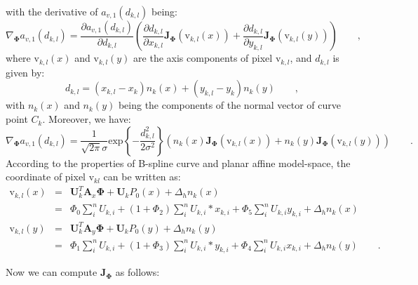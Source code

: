 with the derivative of $a_{v,1}(d_{k,l})$ being:
\begin{equation}
  \label{eq:nablaa}
\nabla_{\mathbf{\Phi}} a_{v,1}(d_{k,l}) = \frac{\partial a_{v,1}(d_{k,l})}{\partial d_{k,l}}
\left( \frac{\partial d_{k,l}}{\partial x_{k,l}}\mathbf{J}_{\mathbf{\Phi}}(\mathrm{v}_{k,l}(x)) + \frac{\partial d_{k,l}}{\partial y_{k,l}}\mathbf{J}_{\mathbf{\Phi}}(\mathrm{v}_{k,l}(y))
 \right)  \qquad,
\end{equation}
where $\mathrm{v}_{k,l}(x)$ and $\mathrm{v}_{k,l}(y)$ are the axis
components of pixel $\mathrm{v}_{k,l}$, and $d_{k,l}$ is given by:
\begin{equation}
  \label{eq:diskl}
  d_{k,l} = (x_{k,l} - x_{k})n_{k}(x) +(y_{k,l} - y_{k}) n_{k}(y)\qquad,
\end{equation}
with $n_{k}(x)$ and $n_{k}(y)$ being the components of the normal vector of
curve point $C_{k}$. Moreover, we have:
\begin{equation}
  \label{eq:nabladkl}
  \nabla_{\mathbf{\Phi}} a_{v,1}(d_{k,l}) = \frac{1}{\sqrt{2\pi}\sigma} \mathrm{exp}\left\{ -\frac{d_{k,l}^2}{2\sigma^2} \right\}
\left( n_k(x)\mathbf{J}_{\mathbf{\Phi}}(\mathrm{v}_{k,l}(x)) + n_k(y)\mathbf{J}_{\mathbf{\Phi}}(\mathrm{v}_{k,l}(y))
 \right) \qquad.
\end{equation}
According to the properties of  B-spline curve  and planar affine
model-space, the coordinate of pixel $\mathrm{v}_{kl}$ can be written
as:
\begin{eqnarray}
  \label{eq:vkl}
\mathrm{v}_{k,l}(x) &= & \mathbf{U}_k^{T}\mathbf{A}_x \mathbf{\Phi} + \mathbf{U}_k P_0(x) + \Delta_h n_k(x) \\
          &=&\Phi_0\sum_{i}^nU_{k,i} +
          (1+\Phi_2)\sum_{i}^nU_{k,i}*x_{k,i} + \Phi_{5}\sum_{i}^n
          U_{k,i}y_{k,i} + \Delta_h n_k(x)\\
\mathrm{v}_{k,l}(y) &=& \mathbf{U}_k^{T}\mathbf{A}_y \mathbf{\Phi} +
\mathbf{U}_k P_0(y) + \Delta_h n_k(y) \\
          &=&\Phi_1\sum_{i}^nU_{k,i} +
          (1+\Phi_3)\sum_{i}^nU_{k,i}*y_{k,i} + \Phi_{4}\sum_{i}^n
          U_{k,i}x_{k,i} + \Delta_h n_k(y)\qquad.
\end{eqnarray}

Now we can compute $\mathbf{J}_{\mathbf{\Phi}}$ as follows:

